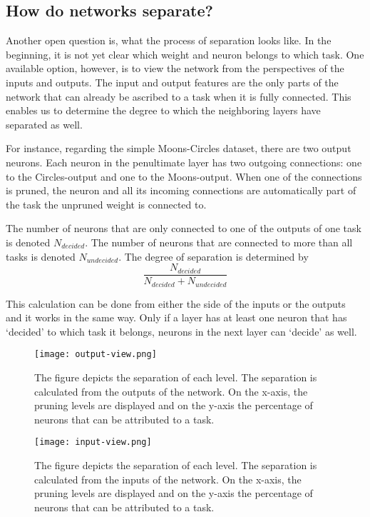 \subsection{How do networks separate?}
Another open question is, what the process of separation looks like.
In the beginning, it is not yet clear which weight and neuron belongs to which task.
One available option, however, is to view the network from the perspectives of the inputs and outputs.
The input and output features are the only parts of the network that can already be ascribed to a task when it is fully connected.
This enables us to determine the degree to which the neighboring layers have separated as well.

For instance, regarding the simple Moons-Circles dataset, there are two output neurons.
Each neuron in the penultimate layer has two outgoing connections: one to the Circles-output and one to the Moons-output.
When one of the connections is pruned, the neuron and all its incoming connections are automatically part of the task the unpruned weight is connected to.

The number of neurons that are only connected to one of the outputs of one task is denoted $N_{decided}$.
The number of neurons that are connected to more than all tasks is denoted $N_{undecided}$.
The degree of separation is determined by 
\[
\frac{N_{decided}}{N_{decided}+N_{undecided}}
\]

This calculation can be done from either the side of the inputs or the outputs and it works in the same way.
Only if a layer has at least one neuron that has `decided' to which task it belongs, neurons in the next layer can `decide' as well.

\begin{figure}[ht]
    \centering
    \texttt{[image: output-view.png]}
    \caption{
    The figure depicts the separation of each level.
    The separation is calculated from the outputs of the network.
    On the x-axis, the pruning levels are displayed and on the y-axis the percentage of neurons that can be attributed to a task.
    }\label{fig:outview}
\end{figure}

\begin{figure}[ht]
    \centering
    \texttt{[image: input-view.png]}
    \caption{    
    The figure depicts the separation of each level.
    The separation is calculated from the inputs of the network.
    On the x-axis, the pruning levels are displayed and on the y-axis the percentage of neurons that can be attributed to a task.
    }\label{fig:inview}
\end{figure}

